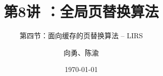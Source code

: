 



\title[第8讲]{第8讲 ：全局页替换算法} %
\subtitle{第四节：面向缓存的页替换算法 -- LIRS}
\author{向勇、陈渝} %
\date{\today} %




\begin{frame}
\titlepage %
\end{frame}

